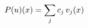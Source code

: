 \documentclass[preview]{standalone}
\begin{document}
\begin{align*}
\special{dvisvgm:raw <g id='unique000'>}P(u)(x) = \sum_j c_j\, v_j(x)\special{dvisvgm:raw </g>}
\end{align*}
\end{document}

